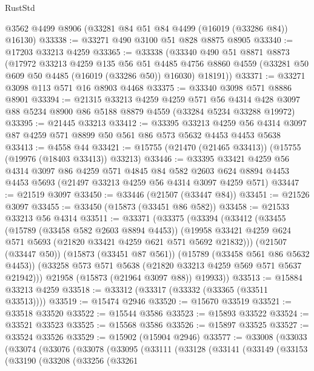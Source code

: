 \begin{lexlean}{RustStd}
\begin{coremodule}
    @3562
    @4499
    @8906
    (@33281 @84 @51 @84 @4499 (@16019 (@33286 @84)) @16130)
@33338 := @33271 @490 @3100 @51 @828 @8875 @8905
@33340 := @17203 @33213 @4259
@33365 := @33338
    (@33340
      @490
      @51
      @8871
      @8873
      (@17972
        @33213
        @4259
        @135
        @56
        @51
        @4485
        @4756
        @8860
        @4559
        (@33281 @50 @609 @50 @4485 (@16019 (@33286 @50)) @16030)
        @18191))
@33371 := @33271 @3098 @113 @571 @16 @8903 @4468
@33375 := @33340 @3098 @571 @8886 @8901
@33394 := @21315
    @33213
    @4259
    @4259
    @571
    @56
    @4314
    @428
    @3097
    @88
    @5234
    @8900
    @86
    @5188
    @8879
    @4559
    (@33284 @5234 @33288 @19972)
@33395 := @21445 @33213
@33412 := @33395
    @33213
    @4259
    @56
    @4314
    @3097
    @87
    @4259
    @571
    @8899
    @50
    @561
    @86
    @573
    @5632
    @4453
    @4453
    @5638
@33413 := @4558 @44
@33421 := @15755 (@21470 (@21465 @33413)) (@15755 (@19976 (@18403 @33413)) @33213)
@33446 := @33395
    @33421
    @4259
    @56
    @4314
    @3097
    @86
    @4259
    @571
    @4845
    @84
    @582
    @2603
    @624
    @8894
    @4453
    @4453
    @5693
    (@21497 @33213 @4259 @56 @4314 @3097 @4259 @571)
@33447 := @21519 @3097
@33450 := @33446 (@21507 (@33447 @84))
@33451 := @21526 @3097
@33455 := @33450 (@15873 (@33451 @86 @582))
@33458 := @21533 @33213 @56 @4314
@33511 := @33371
    (@33375
      (@33394
        (@33412
          (@33455
            (@15789 (@33458 @582 @2603 @8894 @4453))
            (@19958 @33421 @4259 @624 @571 @5693 (@21820 @33421 @4259 @621 @571 @5692 @21832)))
          (@21507 (@33447 @50))
          (@15873 (@33451 @87 @561))
          (@15789 (@33458 @561 @86 @5632 @4453))
          (@33258 @573 @571 @5638 (@21820 @33213 @4259 @569 @571 @5637 @21942)))
        @21958
        (@15873 (@21964 @3097 @88))
        @19933))
@33513 := @15884 @33213 @4259
@33518 := @33312 (@33317 (@33332 (@33365 (@33511 @33513))))
@33519 := @15474 @2946
@33520 := @15670 @33519
@33521 := @33518 @33520
@33522 := @15544 @3586
@33523 := @15893 @33522
@33524 := @33521 @33523
@33525 := @15568 @3586
@33526 := @15897 @33525
@33527 := @33524 @33526
@33529 := @15902 (@15904 @2946)
@33577 := @33008
    (@33033
      (@33074
        (@33076
          (@33078
            (@33095
              (@33111
                (@33128
                  (@33141
                    (@33149
                      (@33153
                        (@33190
                          (@33208
                            (@33256
                              (@33261

\end{coremodule}
\end{lexlean}
